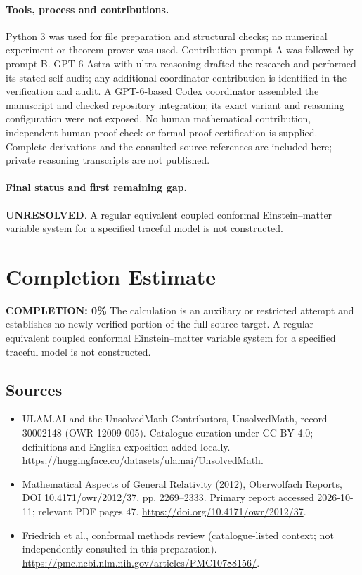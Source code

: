 \documentclass[11pt]{article}
\begin{document}
\paragraph{Tools, process and contributions.}
Python 3 was used for file preparation and structural checks; no numerical experiment or theorem prover was used. Contribution prompt A was followed by prompt B. GPT-6 Astra with ultra reasoning drafted the research and performed its stated self-audit; any additional coordinator contribution is identified in the verification and audit. A GPT-6-based Codex coordinator assembled the manuscript and checked repository integration; its exact variant and reasoning configuration were not exposed. No human mathematical contribution, independent human proof check or formal proof certification is supplied. Complete derivations and the consulted source references are included here; private reasoning transcripts are not published.

\paragraph{Final status and first remaining gap.}
\textbf{UNRESOLVED}. A regular equivalent coupled conformal Einstein–matter variable system for a specified traceful model is not constructed.

\section{Completion Estimate}
\noindent\textbf{COMPLETION: 0\%}
The calculation is an auxiliary or restricted attempt and establishes no newly verified portion of the full source target. A regular equivalent coupled conformal Einstein–matter variable system for a specified traceful model is not constructed.

\subsection{Sources}
\begin{itemize}
\item[\hypertarget{source:30002148:1}{S1}] ULAM.AI and the UnsolvedMath Contributors, UnsolvedMath, record 30002148 (OWR-12009-005). Catalogue curation under CC BY 4.0; definitions and English exposition added locally.
\url{https://huggingface.co/datasets/ulamai/UnsolvedMath}.
\item[\hypertarget{source:30002148:2}{S2}] Mathematical Aspects of General Relativity (2012), Oberwolfach Reports, DOI 10.4171/owr/2012/37, pp. 2269--2333. Primary report accessed 2026-10-11; relevant PDF pages 47.
\url{https://doi.org/10.4171/owr/2012/37}.
\item[\hypertarget{source:30002148:3}{S3}] Friedrich et al., conformal methods review (catalogue-listed context; not independently consulted in this preparation).
\url{https://pmc.ncbi.nlm.nih.gov/articles/PMC10788156/}.
\end{itemize}
\label{end:30002148}
\end{document}
